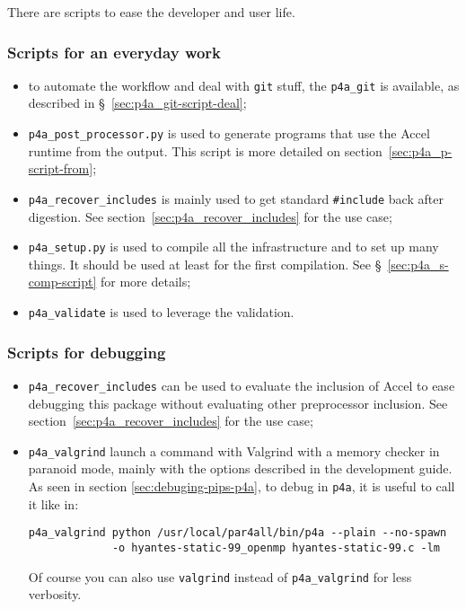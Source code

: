 \documentclass[a4paper]{article}
\begin{document}
There are scripts to ease the developer and user life.


\subsubsection{Scripts for an everyday work}
\label{sec:an-everyday-work}

\begin{itemize}
\item to automate the \Apfa workflow and deal with \texttt{git} stuff, the
  \verb|p4a_git| is available, as described in
  \S~\ref{sec:p4a_git-script-deal};
\item \verb|p4a_post_processor.py| is used to generate programs that use
  the \Apfa Accel runtime from the \Apips output. This script is more
  detailed on section~\ref{sec:p4a_p-script-from};
\item \verb|p4a_recover_includes| is mainly used to get standard
  \verb|#include| back after \Apips digestion. See
  section~\ref{sec:p4a_recover_includes} for the use case;
\item \verb|p4a_setup.py| is used to compile all the \Apfa infrastructure and
  to set up many things. It should be used at least for the first
  compilation. See \S~\ref{sec:p4a_s-comp-script} for more details;
\item \verb|p4a_validate| is used to leverage the \Apips validation.
\end{itemize}


\subsubsection{Scripts for debugging}
\label{sec:scripts-debugging}

\begin{itemize}
\item \verb|p4a_recover_includes| can be used to evaluate the inclusion of
  \Apfa Accel to ease debugging this package without evaluating other
  preprocessor inclusion. See section~\ref{sec:p4a_recover_includes} for
  the use case;
\item \verb|p4a_valgrind| launch a command with Valgrind with a memory
  checker in paranoid mode, mainly with the options described in the
  \Apips development guide. As seen in section
  \ref{sec:debuging-pips-p4a}, to debug \Apips in \texttt{p4a}, it is
  useful to call it like in:
\begin{verbatim}
p4a_valgrind python /usr/local/par4all/bin/p4a --plain --no-spawn
             -o hyantes-static-99_openmp hyantes-static-99.c -lm
\end{verbatim}
  Of course you can also use \texttt{valgrind} instead of
  \verb/p4a_valgrind/ for less verbosity.
\end{itemize}
\end{document}
